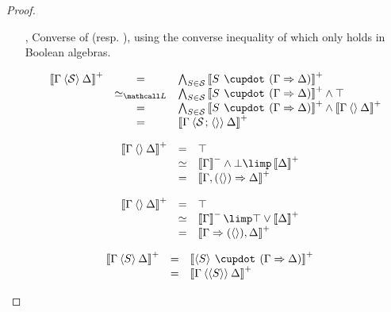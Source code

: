 \begin{proof}
\begin{itemize}
    \item[{\rnmsf{f{+}{+}{\downarrow}}}, {\rnmsf{f{-}{-}{\downarrow}}}] Converse
    of {} (resp. {}), using
    the converse inequality of  which only holds
    in Boolean algebras.

    \item[\rsf{p}]
    $$
    \begin{array}{rcll}
      \psint{\Gamma \piq{\cS} \Delta}
      &=& \psintAndMix{S}{\cS}{\Gamma}{\Delta} \\
      &\semequiv_{\Lattice}& \psintAndMix{S}{\cS}{\Gamma}{\Delta} \wedge \top \\
      &=& \psintAndMix{S}{\cS}{\Gamma}{\Delta} \wedge \psint{\Gamma \piq{} \Delta} \\
      &=& \psint{\Gamma \piq{\cS \sep \piq{}} \Delta} \\
    \end{array}
    $$

    \item[\rsf{p{-}}]
    $$
    \begin{array}{rcll}
      \psint{\Gamma \piq{} \Delta}
      &=& \top & \\
      &\semequiv& \nsint{\Gamma} \wedge \bot \limp \psint{\Delta} & \\
      &=& \psint{\Gamma, (\piq{}) \seq \Delta} & \\
    \end{array}
    $$

    \item[\rsf{p{+}}]
    $$
    \begin{array}{rcll}
      \psint{\Gamma \piq{} \Delta}
      &=& \top & \\
      &\semequiv& \nsint{\Gamma} \limp \top \lor \psint{\Delta} & \\
      &=& \psint{\Gamma \seq (\piq{}), \Delta} & \\
    \end{array}
    $$

    \item[\rsf{a}]
    $$
    \begin{array}{rcll}
      \psint{\Gamma \piq{S} \Delta}
      &=& \psint{\piq{S} \mix (\Gamma \seq \Delta)} & \\
      &=& \psint{\Gamma \piq{\piq{S}} \Delta} & \\
    \end{array}
    $$


\end{itemize}
\end{proof}
